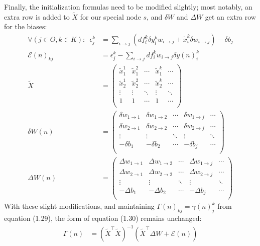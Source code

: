 \documentclass[12pt]{article}
\renewcommand{\ij}{i \rightarrow j}
\begin{document}
Finally, the initialization formulas need to be modified slightly;
most notably, an extra row is added to $\tilde{X}$ for our special node $s$,
and $\delta W$ and $\Delta W$ get an extra row for the biases:
\begin{align}
\forall (j \in O, k \in K): \,\,\, \epsilon_j^k & = 
\sum_{\ij} (df_i^k \delta y_i^k w_{\ij} + \tilde{x}_i^k \delta w_{\ij}) 
- \delta b_j \\
\mathcal{E}(n)_{kj} & = \epsilon_j^k - \sum_{\ij} df_i^k w_{\ij} \delta y(n)_i^k \\
\tilde{X} & = \left( \begin{array}{ccccc}
        \tilde{x}_1^1 & \tilde{x}_1^2 & \cdots & \tilde{x}_1^k & \cdots \\
        \tilde{x}_2^1 & \tilde{x}_2^2 & \cdots & \tilde{x}_2^k & \cdots \\
        \vdots & \vdots & \ddots & \vdots & \ddots \\
        1 & 1 & \cdots & 1 & \cdots \\
        \end{array}
        \right) \\
\delta W(n) & = \left( \begin{array}{ccccc}
        \delta w_{1 \rightarrow 1} & \delta w_{1 \rightarrow 2} & \cdots & \delta w_{1 \rightarrow j} & \cdots \\
        \delta w_{2 \rightarrow 1} & \delta w_{2 \rightarrow 2} & \cdots & \delta w_{2 \rightarrow j} & \cdots \\
        \vdots & \vdots & \ddots & \vdots & \ddots \\
        -\delta b_1 & -\delta b_2 & \cdots & -\delta b_j & \cdots \\
        \end{array}
        \right) \\
\Delta W(n) & = \left( \begin{array}{ccccc}
        \Delta w_{1 \rightarrow 1} & \Delta w_{1 \rightarrow 2} & \cdots & \Delta w_{1 \rightarrow j} & \cdots \\
        \Delta w_{2 \rightarrow 1} & \Delta w_{2 \rightarrow 2} & \cdots & \Delta w_{2 \rightarrow j} & \cdots \\
        \vdots & \vdots & \ddots & \vdots & \ddots \\
        -\Delta b_1 & -\Delta b_2 & \cdots & -\Delta b_j & \cdots \\
        \end{array}
        \right)
\end{align}
With these slight modifications, and maintaining $\Gamma(n)_{kj} = \gamma(n)_j^k$ from equation (1.29),
the form of equation (1.30) remains unchanged:
\begin{align}
\Gamma(n) & = (\tilde{X}^\top \tilde{X})^{-1} (\tilde{X}^\top \Delta W + \mathcal{E}(n))
\end{align}
\end{document}
